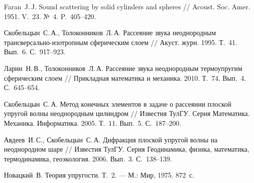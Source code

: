 \newpage

\begin{thebibliography}{99}

Faran~J.\,J. Sound scattering by solid cylinders and spheres // Acoust. Soc. Amer. 1951. V.~23. №~4. P.~405--420.

Скобельцын~С.\,А., Толоконников~Л.\,А. Рассеяние звука неоднородным трансверсально-изотропным сферическим слоем // Акуст. журн. 1995. Т.~41. Вып.~6. С.~917--923.

Ларин~Н.\,В., Толоконников~Л.\,А. Рассеяние звука неоднородным термоупругим сферическим слоем // Прикладная математика и механика. 2010. Т.~74. Вып.~4. С.~645--654.

Скобельцын~С.\,А. Метод конечных элементов в задаче о рассеянии плоской упругой волны неоднородным цилиндром // Известия ТулГУ. Серия Математика. Механика. Информатика. 2005. Т.~11. Вып.~5. С.~187--200.

Авдеев~И.\,С., Скобельцын~С.\,А. Дифракция плоской упругой волны на неоднородном шаре // Известия ТулГУ. Серия Геодинамика, физика, математика, термодинамика, геоэкология. 2006. Вып.~3. С.~138--139.




Новацкий~В. Теория упругости. Т.~2. --- М.: Мир, 1975. 872~с.











\end{thebibliography}